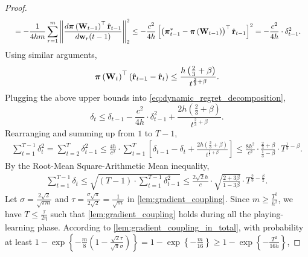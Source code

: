 \begin{proof}
\begin{equation*}
\begin{split}
    &\quad = - \frac{1}{4 h m} \sum\limits_{r=1}^{m}{ \left\| \frac{d {\boldsymbol{\pi}}\left( {\mathbf{W}}_{t-1} \right)^\top \hat{{\mathbf{r}}}_{t-1}}{d {\mathbf{w}}_r(t-1)} \right\|_2^2 } \le - \frac{c^2}{4 h} \left[ \left( {{\boldsymbol{\pi}}_{t-1}^*} - {\boldsymbol{\pi}}\left( {\mathbf{W}}_{t-1} \right) \right)^\top \hat{{\mathbf{r}}}_{t-1}  \right]^2 = - \frac{c^2}{4 h} \cdot \delta_{t-1}^2.
\end{split}
\end{equation*}
Using similar arguments,
\begin{equation*}
    {\boldsymbol{\pi}}\left( {\mathbf{W}}_t \right)^\top \left( \hat{{\mathbf{r}}}_{t-1} - \hat{{\mathbf{r}}}_t  \right) \le \frac{ h  \left(\frac{2}{3} + \beta \right) }{t^{\frac{2}{3} + \beta}}.
\end{equation*}
Plugging the above upper bounds into \cref{eq:dynamic_regret_decomposition},
\begin{equation*}
    \delta_t \le \delta_{t-1} - \frac{c^2}{4 h} \cdot \delta_{t-1}^2 + \frac{ 2 h  \left(\frac{2}{3} + \beta \right) }{t^{\frac{2}{3} + \beta}}.
\end{equation*}
Rearranging and summing up from $1$ to $T-1$,
\begin{equation*}
\begin{split}
    \sum\limits_{t=1}^{T-1}{\delta_{t}^2} = \sum\limits_{t=2}^{T}{\delta_{t-1}^2} \le \frac{4 h}{ c^2} \cdot  \sum\limits_{t=1}^{T} { \left[ \delta_{t-1} - \delta_t + \frac{ 2 h  \left(\frac{2}{3} + \beta \right) }{t^{\frac{2}{3} + \beta}} \right] } \le \frac{8 h^2}{ c^2} \cdot \frac{  \frac{2}{3} + \beta }{\frac{1}{3} - \beta} \cdot T^{\frac{1}{3} - \beta}.
\end{split}
\end{equation*}
By the Root-Mean Square-Arithmetic Mean inequality,
\begin{equation*}
\begin{split}
    \sum\limits_{t=1}^{T-1}{\delta_{t}} \le \sqrt{\left(T  - 1 \right) \cdot \sum\limits_{t=1}^{T-1}{\delta_{t-1}^2}} \le \frac{2 \sqrt{2} h}{c} \cdot \sqrt{\frac{2 + 3 \beta}{1 - 3 \beta}} \cdot  T^{\frac{2}{3} - \frac{\beta}{2}}.
\end{split}
\end{equation*}
Let $\sigma = \frac{2 \sqrt{2}}{\sqrt{\pi m}}$ and $\tau = \frac{\sigma \sqrt{\pi}}{2 \sqrt{2}} = \frac{1}{\sqrt{m}}$ in \cref{lem:gradient_coupling}. Since $m \ge \frac{T^2}{h^2}$, we have $T \le \frac{\tau}{2 \eta}$ such that \cref{lem:gradient_coupling} holds during all the playing-learning phase. According to \cref{lem:gradient_coupling_in_total}, with probability at least $1 - \exp\left\{ - \frac{m}{8} \left( 1 - \frac{\sqrt{2}\tau}{\sqrt{\pi}\sigma} \right) \right\} = 1 - \exp\left\{ - \frac{m}{16} \right\} \ge 1 - \exp\left\{ - \frac{T^2}{16 h} \right\}$,
\end{proof}



